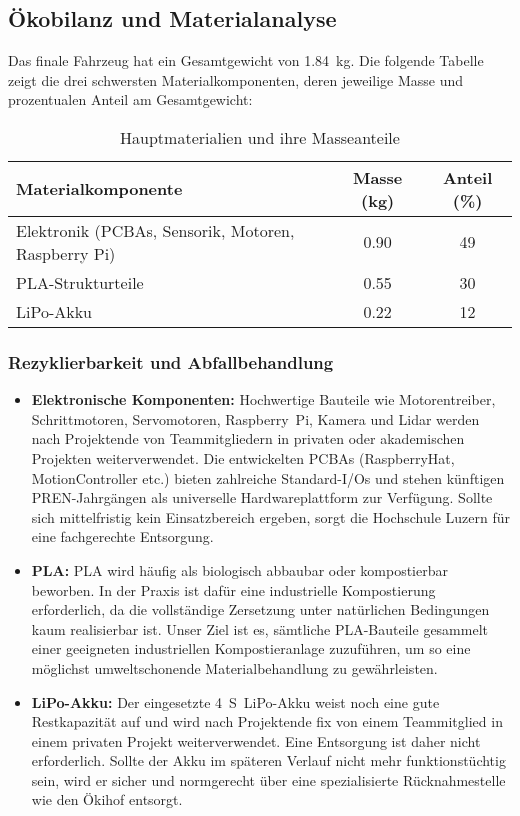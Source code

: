 \documentclass[main.tex]{subfiles} %
\begin{document}

\subsection{Ökobilanz und Materialanalyse}

Das finale Fahrzeug hat ein Gesamtgewicht von \SI{1.84}{\kilo\gram}. Die folgende 
Tabelle zeigt die drei schwersten Materialkomponenten, deren jeweilige Masse und 
prozentualen Anteil am Gesamtgewicht:

\begin{table}[H]
\centering
\begin{tabular}{|l|c|c|}
\hline
\textbf{Materialkomponente} & \textbf{Masse (kg)} & \textbf{Anteil (\%)} \\
\hline
Elektronik (PCBAs, Sensorik, Motoren, Raspberry Pi) & 0.90 & 49 \\
PLA-Strukturteile & 0.55 & 30 \\
LiPo-Akku & 0.22 & 12 \\
\hline
\end{tabular}
\caption{Hauptmaterialien und ihre Masseanteile}
\end{table}

\subsubsection*{Rezyklierbarkeit und Abfallbehandlung}

\begin{itemize}
    \item \textbf{Elektronische Komponenten:} 
    Hochwertige Bauteile wie Motorentreiber, Schrittmotoren, Servomotoren, 
    Raspberry~Pi, Kamera und Lidar werden nach Projektende von Teammitgliedern in 
    privaten oder akademischen Projekten weiterverwendet. Die entwickelten PCBAs 
    (RaspberryHat, MotionController etc.) bieten zahlreiche Standard-I/Os und 
    stehen künftigen PREN-Jahrgängen als universelle Hardwareplattform zur 
    Verfügung. Sollte sich mittelfristig kein Einsatzbereich ergeben, sorgt die 
    Hochschule Luzern für eine fachgerechte Entsorgung.
    
    \item \textbf{PLA:} 
    PLA wird häufig als biologisch abbaubar oder kompostierbar beworben. In der 
    Praxis ist dafür eine industrielle Kompostierung erforderlich, da die 
    vollständige Zersetzung unter natürlichen Bedingungen kaum realisierbar ist. 
    Unser Ziel ist es, sämtliche PLA-Bauteile gesammelt einer geeigneten 
    industriellen Kompostieranlage zuzuführen, um so eine möglichst umweltschonende 
    Materialbehandlung zu gewährleisten.
    
    \item \textbf{LiPo-Akku:} 
    Der eingesetzte \SI{4}{S}~LiPo-Akku weist noch eine gute Restkapazität auf und 
    wird nach Projektende fix von einem Teammitglied in einem privaten Projekt 
    weiterverwendet. Eine Entsorgung ist daher nicht erforderlich. Sollte der Akku 
    im späteren Verlauf nicht mehr funktionstüchtig sein, wird er sicher und 
    normgerecht über eine spezialisierte Rücknahmestelle wie den Ökihof entsorgt.
\end{itemize}
\end{document}
